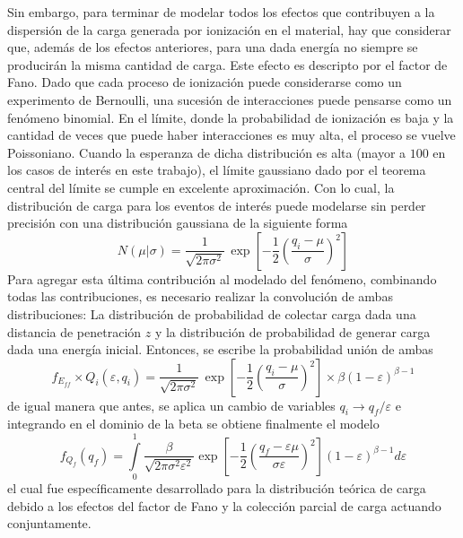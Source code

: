 Sin embargo, para terminar de modelar todos los efectos que contribuyen a la dispersión de la carga generada por ionización en el material, hay que considerar que, además de los efectos anteriores, para una dada energía no siempre se producirán la misma cantidad de carga. Este efecto es descripto por el factor de Fano. Dado que cada proceso de ionización puede considerarse como un experimento de Bernoulli, una sucesión de interacciones puede pensarse como un fenómeno binomial. En el límite, donde la probabilidad de ionización es baja y la cantidad de veces que puede haber interacciones es muy alta, el proceso se vuelve Poissoniano. Cuando la esperanza de dicha distribución es alta (mayor a $100$ en los casos de interés en este trabajo), el límite gaussiano dado por el teorema central del límite se cumple en excelente aproximación. Con lo cual, la distribución de carga para los eventos de interés puede modelarse sin perder precisión con una distribución gaussiana de la siguiente forma
\begin{equation*}
    N(\mu|\sigma) = 
    \frac{1}{\sqrt{2\pi \sigma^{2}}}\,
    \exp
        \left[
            -\frac{1}{2}
            \left(
                \frac{q_{i} - \mu}{\sigma}
            \right)^{2}
        \right]
\end{equation*}
Para agregar esta última contribución al modelado del fenómeno, combinando todas las contribuciones, es necesario realizar la convolución de ambas distribuciones: La distribución de probabilidad de colectar carga dada una distancia de penetración $z$ y la distribución de probabilidad de generar carga dada una energía inicial. Entonces, se escribe la probabilidad unión de ambas
\begin{equation*}
    f_{E_{ff}} \times Q_{i}(\varepsilon, q_{i})
    = \frac{1}{\sqrt{2\pi \sigma^{2}}}\,
    \exp
        \left[
            -\frac{1}{2}
            \left(
                \frac{q_{i} - \mu}{\sigma}
            \right)^{2}
        \right]
    \times
    \beta(1-\varepsilon)^{\beta - 1}
\end{equation*}
de igual manera que antes, se aplica un cambio de variables $q_{i}\longrightarrow q_{f}/\varepsilon$ e integrando en el dominio de la beta se obtiene finalmente el modelo
\begin{equation}
    f_{Q_{f}}(q_{f}) = 
    \int\limits_{0}^{1}
    \frac{\beta}{\sqrt{2\pi \sigma^{2}\varepsilon^{2}}}
    \exp
        \left[
            -\frac{1}{2}
            \left(
                \frac{q_{f} - \varepsilon\mu}{\sigma\varepsilon}
            \right)^{2}
        \right]
    (1-\varepsilon)^{\beta - 1}
    d\varepsilon
    \label{ec:UnbinnedFit}
\end{equation}
el cual fue específicamente desarrollado para la distribución teórica de carga debido a los efectos del factor de Fano y la colección parcial de carga actuando conjuntamente.
